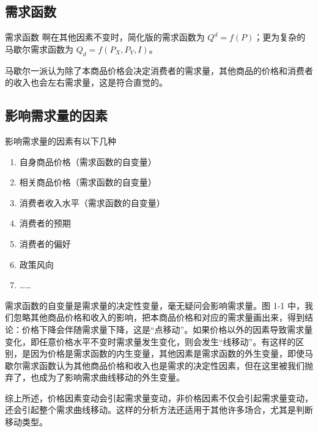 \subsection{需求函数}

\begin{definition}{需求函数}
    啊在其他因素不变时，简化版的需求函数为 $Q^d=f\left(P\right)$；更为复杂的马歇尔需求函数为 $Q_d=f\left(P_X,P_Y,I\right)$。
\end{definition}

马歇尔一派认为除了本商品价格会决定消费者的需求量，其他商品的价格和消费者的收入也会左右需求量，这是符合直觉的。

\subsection{影响需求量的因素}

影响需求量的因素有以下几种
\begin{enumerate}
    \item 自身商品价格（需求函数的自变量）
    \item 相关商品价格（需求函数的自变量）
    \item 消费者收入水平（需求函数的自变量）
    \item 消费者的预期
    \item 消费者的偏好
    \item 政策风向
    \item ……
\end{enumerate}

需求函数的自变量是需求量的决定性变量，毫无疑问会影响需求量。图 1-1 中，我们忽略其他商品价格和收入的影响，把本商品价格和对应的需求量画出来，得到结论：价格下降会伴随需求量下降，这是“点移动”。如果价格以外的因素导致需求量变化，即任意价格水平不变时需求量发生变化，则会发生“线移动”。有这样的区别，是因为价格是需求函数的内生变量，其他因素是需求函数的外生变量，即使马歇尔需求函数认为其他商品价格和收入也是需求的决定性因素，但在这里被我们抛弃了，也成为了影响需求曲线移动的外生变量。

综上所述，价格因素变动会引起需求量变动，非价格因素不仅会引起需求量变动，还会引起整个需求曲线移动。这样的分析方法还适用于其他许多场合，尤其是判断移动类型。


